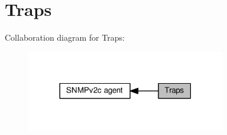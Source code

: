 \hypertarget{group__snmp__traps}{}\section{Traps}
\label{group__snmp__traps}
Collaboration diagram for Traps\+:
\nopagebreak
\begin{figure}[H]
\begin{center}
\leavevmode
\includegraphics[width=246pt]{group__snmp__traps}
\end{center}
\end{figure}
